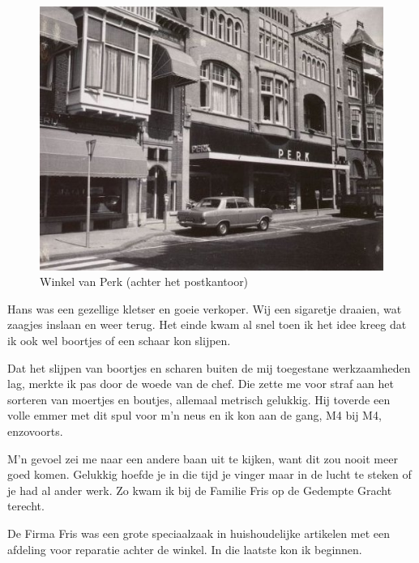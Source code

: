 \documentclass[12pt,twoside, openright]{memoir}
\begin{document}
\begin{figure}
\centering
\includegraphics[width=\textwidth]{img/199perk}
\caption*{\footnotesize Winkel van Perk (achter het postkantoor)}
\end{figure}

Hans was een gezellige kletser en goeie verkoper. Wij een sigaretje draaien, wat zaagjes inslaan en weer terug. Het einde kwam al snel toen ik het idee kreeg dat ik ook wel boortjes of een schaar kon slijpen. 

Dat het slijpen van boortjes en scharen buiten de mij toegestane werkzaamheden lag, merkte ik pas door de woede van de chef. Die zette me voor straf aan het sorteren van moertjes en boutjes, allemaal metrisch gelukkig. Hij toverde een volle emmer met dit spul voor m’n neus en ik kon aan de gang, M4 bij M4, enzovoorts. 

M’n gevoel zei me naar een andere baan uit te kijken, want dit zou nooit meer goed komen. Gelukkig hoefde je in die tijd je vinger maar in de lucht te steken of je had al ander werk. Zo kwam ik bij de Familie Fris op de Gedempte Gracht terecht.

De Firma Fris was een grote speciaalzaak in huishoudelijke artikelen met een afdeling voor reparatie achter de winkel. In die laatste kon ik beginnen. 
\end{document}
